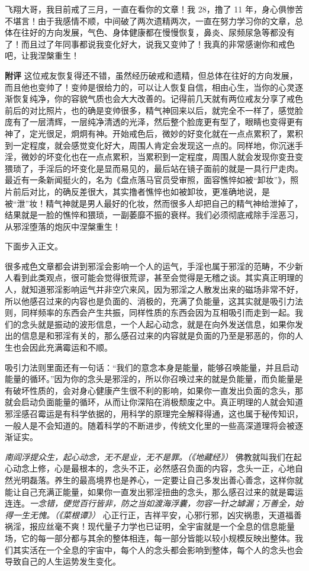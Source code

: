 \begin{case}
    飞翔大哥，我目前戒了三月，一直在看你的文章！我 28，撸了 11 年，身心俱惨苦不堪言！由于我感情不顺，中间破了两次遗精两次，一直在努力学习你的文章，总体在往好的方向发展，气色、身体健康都在慢慢恢复，鼻炎、尿频尿急等都没有了！而且过了年同事都说我变化好大，说我又变帅了！我真的非常感谢你和戒色吧，让我涅槃重生！

    \textbf{附评} 这位戒友恢复得还不错，虽然经历破戒和遗精，但总体在往好的方向发展，而且他也变帅了！变帅是很给力的，可以让人恢复自信，相由心生，当你的心灵逐渐恢复纯净，你的容貌气质也会大大改善的。记得前几天就有两位戒友分享了戒色前后的对比照片，也的确是变帅很多，精气神回来以后，就完全不一样了，感觉脸庞有了一层清辉，一层纯净清透的光泽，然后整个脸庞更有型了，眼睛也变得更有神了，定光很足，炯炯有神。开始戒色后，微妙的好变化就在一点点累积了，累积到一定程度，就会感觉变化好大，周围人肯定会发现这一点的。同样地，你沉迷手淫，微妙的坏变化也在一点点累积，当累积到一定程度，周围人就会发现你变丑变猥琐了，手淫后的坏变化是显而易见的，最后站在镜子面前的就是一具行尸走肉。最近有一条新闻挺火的，名为《盘点落马官员受审照，面容憔悴如被“卸妆”》，照片前后对比，的确反差很大，其实撸者憔悴也如被卸妆，更准确地说，是被“泄”妆！精气神就是男人最好的化妆，然而很多人却把自己的精气神给泄掉了，结果就是一脸的憔悴和猥琐，一副萎靡不振的衰样。我们必须彻底戒除手淫恶习，从邪淫堕落的炮灰中涅槃重生！
\end{case}

下面步入正文。

很多戒色文章都会讲到邪淫会影响一个人的运气，手淫也属于邪淫的范畴，不少新人看到此类观点，很可能会觉得很荒谬，甚至会觉得是无稽之谈。其实真正明理的人，就知道邪淫影响运气并非空穴来风，因为邪淫之人散发出来的磁场非常不好，所以他感召过来的内容也是负面的、消极的，充满了负能量，这其实就是吸引力法则，同样频率的东西会产生共振，同样性质的东西会因为互相吸引而走到一起。我们的念头就是振动的波形信息，一个人起心动念，就是在向外发送信息，如果你发出的信息是和邪淫有关的，那么感召过来的内容就是负面的乃至是邪恶的，你的人生也会因此充满霉运和不顺。

吸引力法则里面还有一句话：“我们的意念本身是能量，能够召唤能量，并且启动能量的循环。”因为你的念头是邪淫的，所以你召唤过来的就是负能量，而负能量是有破坏性质的，会对身心健康产生很不利的影响，如果你一直发出负面的念头，那就会启动负面能量的循环，从而让你深陷在消极颓废之中。真正明理的人就会知道邪淫感召霉运是有科学依据的，用科学的原理完全解释得通，这也属于秘传知识，一般人是不会知道的。随着科学的不断进步，传统文化里的一些高深道理将会被逐渐证实。

\textit{南阎浮提众生，起心动念，无不是业，无不是罪。（《地藏经》）} 佛教就叫我们在起心动念上修，心是最根本的，念头不正，必然感召负面的内容，念头一正，心地自然光明磊落。养生的最高境界也是养心，一定要让自己多发出善心善念，这样你就能让自己充满正能量，如果你一直发出邪淫扭曲的念头，那么感召过来的就是霉运连连。\textit{一念错，便觉百行皆非，防之当如渡海浮囊，勿容一针之罅漏；万善全，始得一生无愧。（《菜根谭》）} 心正行正，吉祥平安，心邪行邪，凶灾祸患，天道福善祸淫，报应丝毫不爽！现代量子力学也已证明，全宇宙就是一个全息的信息能量场，它的每一部分都与其余的整体相连，每一部分皆能以较小规模反映出整体。我们其实活在一个全息的宇宙中，每个人的念头都会影响到整体，每个人的念头也会导致自己的人生运势发生变化。

